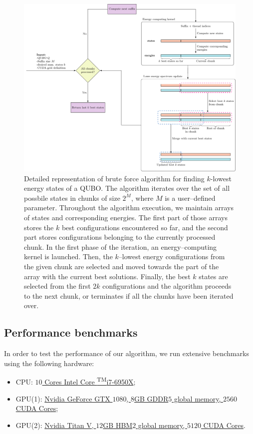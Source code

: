 \begin{figure}
  \includegraphics[width=\textwidth]{figures/bruteforce}
  \caption{
    Detailed representation of brute force algorithm for finding $k$-lowest energy
    states of a QUBO. The algorithm iterates over the set of all possbile states in
    chunks of size $2^{M}$, where $M$ is a user--defined parameter. Throughout the
    algorithm execution, we maintain arrays of states and corresponding energies.
    The first part of those arrays stores the $k$ best configurations encountered
    so far, and the second part stores configurations belonging to the currently
    processed chunk. In the first phase of the iteration, an energy--computing
    kernel is launched. Then, the $k$--lowest energy configurations from the given
    chunk are selected and moved towards the part of the array with the current
    best solutions. Finally, the best $k$ states are selected from the first $2k$
    configurations and the algorithm proceeds to the next chunk, or terminates if
    all the chunks have been iterated over. } \label{fig:bruteforce}
\end{figure}

\subsection{Performance benchmarks}
In order to test the performance of our algorithm, we run extensive benchmarks
using the following hardware:
%
\begin{itemize}
  \item CPU:
    \href{https://ark.intel.com/products/94456/Intel-Core-i7-6950X-Processor-Extreme-Edition-25M-Cache-up-to-3-50-GHz-}{$10$
      Cores {\rmfamily Intel\textregistered} Core \textsuperscript{TM}i7-6950X};
  \item GPU(1):
    \href{https://www.nvidia.com/en-us/geforce/products/10series/geforce-gtx-1080}{Nvidia
      GeForce GTX $1080$, $8$GB GDDR$5$ global memory, $2560$ CUDA Cores};
  \item  GPU(2): \href{https://www.nvidia.com/en-us/titan/titan-v/}{Nvidia Titan V,
      $12$GB HBM$2$ global memory, $5120$ CUDA Cores}.
\end{itemize}

